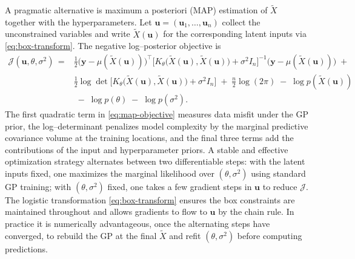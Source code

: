 \documentclass[a4paper,12pt]{article}
\begin{document}
A pragmatic alternative is maximum a posteriori (MAP) estimation of $\tilde{X}$ together with the hyperparameters. Let $\mathbf{u}=(\mathbf{u}_1,\ldots,\mathbf{u}_n)$ collect the unconstrained variables and write $\tilde{X}(\mathbf{u})$ for the corresponding latent inputs via \eqref{eq:box-transform}. The negative log–posterior objective is
\begin{equation}
\label{eq:map-objective}
\begin{split}
\mathcal{J}(\mathbf{u},\theta,\sigma^2)
\,=& \frac{1}{2}\big(\mathbf{y}- \mu(\tilde{X}(\mathbf{u}))\big)^\top\!\!\Big[K_\theta\big(\tilde{X}(\mathbf{u}),\tilde{X}(\mathbf{u})\big)+\sigma^2 I_n\Big]^{-1}\!\big(\mathbf{y}-\mu(\tilde{X}(\mathbf{u}))\big)
\;+\; \\
&\frac{1}{2}\log\!\det\!\Big[K_\theta\big(\tilde{X}(\mathbf{u}),\tilde{X}(\mathbf{u})\big)+\sigma^2 I_n\Big]
\;+\; \frac{n}{2}\log(2\pi)
\;-\; \log p(\tilde{X}(\mathbf{u})) \\
& \;-\; \log p(\theta)
\;-\; \log p(\sigma^2).
\end{split}
\end{equation}
The first quadratic term in \eqref{eq:map-objective} measures data misfit under the GP prior, the log–determinant penalizes model complexity by the marginal predictive covariance volume at the training locations, and the final three terms add the contributions of the input and hyperparameter priors. A stable and effective optimization strategy alternates between two differentiable steps: with the latent inputs fixed, one maximizes the marginal likelihood over $(\theta,\sigma^2)$ using standard GP training; with $(\theta,\sigma^2)$ fixed, one takes a few gradient steps in $\mathbf{u}$ to reduce $\mathcal{J}$. The logistic transformation \eqref{eq:box-transform} ensures the box constraints are maintained throughout and allows gradients to flow to $\mathbf{u}$ by the chain rule. In practice it is numerically advantageous, once the alternating steps have converged, to rebuild the GP at the final $\tilde{X}$ and refit $(\theta,\sigma^2)$ before computing predictions.
\end{document}
